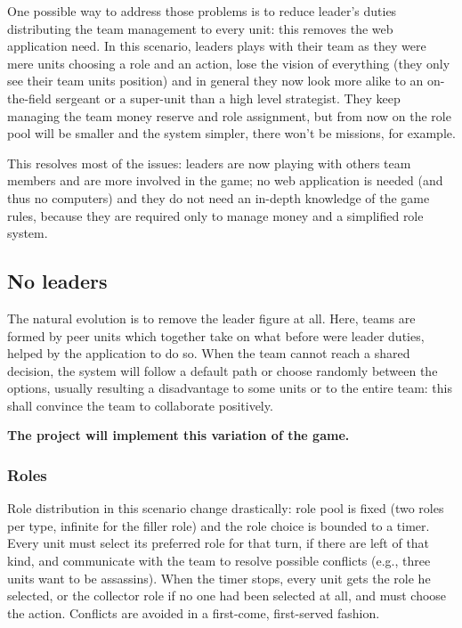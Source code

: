 			One possible way to address those problems is to reduce leader's duties distributing the team management to every unit: this removes the web application need.
			In this scenario, leaders plays with their team as they were mere units choosing a role and an action, lose the vision of everything (they only see their team units position) and in general they now look more alike to an on-the-field sergeant or a super-unit than a high level strategist.
			They keep managing the team money reserve and role assignment, but from now on the role pool will be smaller and the system simpler, there won't be missions, for example.
			
			This resolves most of the issues: leaders are now playing with others team members and are more involved in the game; no web application is needed (and thus no computers) and they do not need an in-depth knowledge of the game rules, because they are required only to manage money and a simplified role system.
		
		\subsection{No leaders}
		
			The natural evolution is to remove the leader figure at all.
			Here, teams are formed by peer units which together take on what before were leader duties, helped by the application to do so.
			When the team cannot reach a shared decision, the system will follow a default path or choose randomly between the options, usually resulting a disadvantage to some units or to the entire team: this shall convince the team to collaborate positively.
			
			\textbf{The project will implement this variation of the game.}
			
			\subsubsection{Roles}
			\label{nolead:role}
				Role distribution in this scenario change drastically: role pool is fixed (two roles per type, infinite for the filler role) and the role choice is bounded to a timer.
				Every unit must select its preferred role for that turn, if there are left of that kind, and communicate with the team to resolve possible conflicts (e.g., three units want to be assassins).
				When the timer stops, every unit gets the role he selected, or the collector role if no one had been selected at all, and must choose the action. Conflicts are avoided in a first-come, first-served fashion.
				
